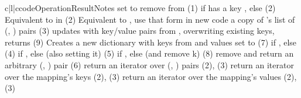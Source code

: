 \begin{tableiii}{c|l|c}{code}{Operation}{Result}{Notes}
          {set  to }
          {}
          {remove  from }
          {(1)}
          { if  has a key , else }
          {(2)}
          {Equivalent to   in }
          {(2)}
          {Equivalent to   , use that form in new code}
          {}
          {a copy of 's list of (, ) pairs}
          {(3)}
          {updates  with key/value pairs from , overwriting
	   existing keys, returns }
          {(9)}
          {Creates a new dictionary with keys from  and values set to }
          {(7)}			   
          { if ,
           else }
          {(4)}
          { if ,
           else  (also setting it)}
          {(5)}
          { if ,
           else  (and remove k)}
          {(8)}
          {remove and return an arbitrary (, ) pair}
          {(6)}
          {return an iterator over (, ) pairs}
          {(2), (3)}
          {return an iterator over the mapping's keys}
          {(2), (3)}
          {return an iterator over the mapping's values}
          {(2), (3)}
\end{tableiii}

